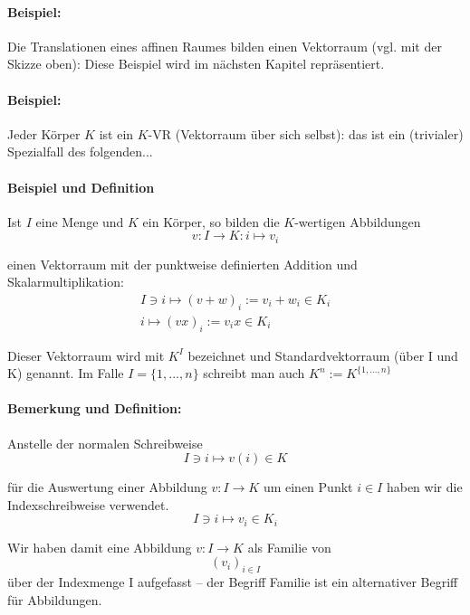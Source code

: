 \documentclass[12pt,a4paper,parskip=half-,DIV=15]{scrreprt}
\begin{document}
\paragraph{Beispiel:} Die Translationen eines affinen Raumes bilden einen Vektorraum (vgl. mit der Skizze oben): Diese Beispiel wird im nächsten Kapitel repräsentiert.
\paragraph{Beispiel:} Jeder Körper $ K $ ist ein $ K $-VR (Vektorraum über sich selbst): das ist ein (trivialer) Spezialfall des folgenden...
\paragraph{Beispiel und Definition} Ist $ I $ eine Menge und $ K $ ein Körper, so bilden die $ K $-wertigen Abbildungen
\begin{equation*}
v: I \to K: i \mapsto v_i
\end{equation*}

einen Vektorraum mit der punktweise definierten Addition und Skalarmultiplikation:
\begin{gather*}
I\ni i \mapsto (v+w)_i := v_i+w_i\in K_i\\ %
i \mapsto (vx)_i := v_ix \in K_i
\end{gather*}

Dieser Vektorraum wird mit $K^{I}$ bezeichnet und Standardvektorraum (über I und K) genannt. Im Falle $ I=\{1,...,n\} $ schreibt man auch $K^{n} := K^{\{1,...,n\}}$

\paragraph{Bemerkung und Definition:} Anstelle der normalen Schreibweise
\begin{equation*}
I\ni i \mapsto v(i) \in K
\end{equation*}

für die Auswertung einer Abbildung  $v: I \to K$ um einen Punkt $i\in I$ haben wir die Indexschreibweise verwendet.
\begin{equation*}
I\ni i \mapsto v_i \in K_i
\end{equation*}

Wir haben damit eine Abbildung $v: I \to K$ als Familie von
\begin{equation*}
(v_i)_{i\in I}
\end{equation*}
über der Indexmenge I aufgefasst -- der Begriff Familie ist ein \glqq alternativer\grqq{} Begriff für Abbildungen.
\end{document}
